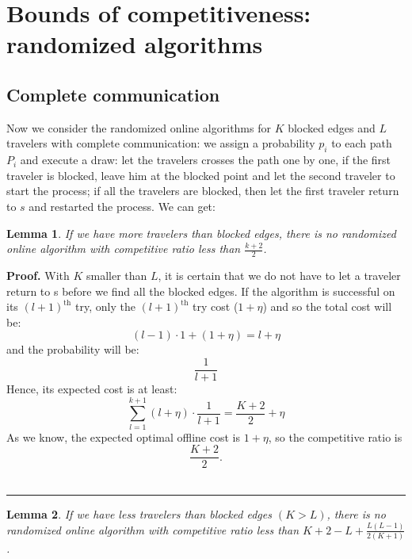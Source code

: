 \documentclass[letter-size, 11pt]{article}
\newtheorem{lemma}{Lemma}
\newenvironment{proof}[1][Proof]{\textbf{#1.} }{\ \rule{0.5em}{0.5em}}
\begin{document}
\section{Bounds of competitiveness: randomized algorithms}
\subsection{Complete communication}
Now we consider the randomized online algorithms for $K$ blocked edges and $L$ travelers with complete communication: we assign a probability $p_i$ to each path $P_i$ and execute a draw: let the travelers crosses the path one by one, if the first traveler is blocked, leave him at the blocked point and let the second traveler to start the process; if all the travelers are blocked, then let the first traveler return to $s$ and restarted the process. 
We can get:

\begin{lemma}
If we have more travelers than blocked edges, there is no randomized online algorithm with competitive ratio less than $\frac{k+2}{2}$.
\label{lemma_moretr}
\end{lemma}

\begin{proof} 
With $K$ smaller than $L$, it is certain that we do not have to let a traveler return to s before we find all the blocked edges. If the algorithm is successful on its $(l+1)^{\text{th}}$ try, only the $(l+1)^{\text{th}}$ try cost ($1+ \eta$) and so the total cost will be:
\[
(l-1)\cdot 1 + (1+\eta) = l+\eta
\]
and the probability will be: 
\[
\frac{1}{l+1}
\]
Hence, its expected cost is at least:
\[
\sum_{l=1}^{k+1}(l+\eta)\cdot \frac{1}{l+1} = \frac{K+2}{2}+\eta
\]
As we know, the expected optimal offline cost is $1 + \eta$, so the competitive ratio is 
\[
\frac{K+2}{2} .
\]
\end{proof}

\begin{lemma}
If we have less travelers than blocked edges $ (K > L )$, there is no randomized online algorithm with competitive ratio less than $
K+2-L+ \frac{L(L-1)}{2(K+1)}$.
\end{lemma}
\end{document}
